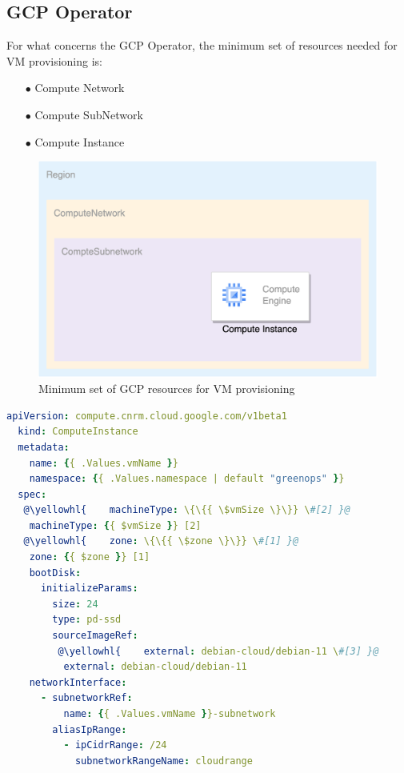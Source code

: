 \subsection{GCP Operator}

For what concerns the GCP Operator, the minimum set of resources needed for VM provisioning is:

\begin{itemize}[itemsep=0.2pt, topsep=1pt] 
  \item[$\bullet$] Compute Network
  \item[$\bullet$] Compute SubNetwork
  \item[$\bullet$] Compute Instance
  \end{itemize}

\begin{figure}[H]
\centering
\includegraphics[width=0.75\linewidth]{images/gcp.png}
\caption{Minimum set of GCP resources for VM provisioning}
\label{fig:gcp}
\end{figure}



\begin{lstlisting}[language=yaml, caption={GCP Intance Custom Resource}, label={lst:gcp}]
  apiVersion: compute.cnrm.cloud.google.com/v1beta1
  kind: ComputeInstance
  metadata:
    name: {{ .Values.vmName }}
    namespace: {{ .Values.namespace | default "greenops" }}
  spec:
   @\yellowhl{    machineType: \{\{{ \$vmSize \}\}} \#[2] }@
    machineType: {{ $vmSize }} [2]
   @\yellowhl{    zone: \{\{{ \$zone \}\}} \#[1] }@
    zone: {{ $zone }} [1]
    bootDisk:
      initializeParams:
        size: 24
        type: pd-ssd
        sourceImageRef:
         @\yellowhl{    external: debian-cloud/debian-11 \#[3] }@
          external: debian-cloud/debian-11
    networkInterface:
      - subnetworkRef:
          name: {{ .Values.vmName }}-subnetwork
        aliasIpRange:
          - ipCidrRange: /24
            subnetworkRangeName: cloudrange
\end{lstlisting}


